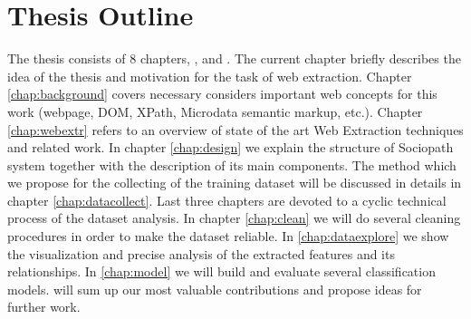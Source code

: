 \section{Thesis Outline}
The thesis consists of 8 chapters, ,  and . The current chapter briefly describes the idea of the thesis and motivation for the task of web extraction. Chapter \ref{chap:background} covers necessary considers important web concepts for this work (webpage, DOM, XPath, Microdata semantic markup, etc.). Chapter \ref{chap:webextr} refers to an overview of state of the art Web Extraction techniques and related work. In chapter \ref{chap:design} we explain the structure of Sociopath system together with the description of its main components. The method which we propose for the collecting of the training dataset will be discussed in details in chapter \ref{chap:datacollect}. Last three chapters are devoted to a cyclic technical process of the dataset analysis. In chapter \ref{chap:clean} we will do several cleaning procedures in order to make the dataset reliable. In \ref{chap:dataexplore} we show the visualization and precise analysis of the extracted features and its relationships. In \ref{chap:model} we will build  and evaluate several classification models.  will sum up our most valuable contributions and propose ideas for further work.